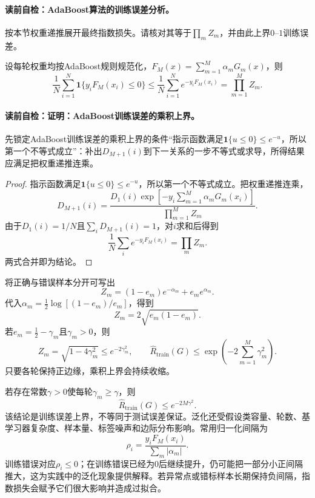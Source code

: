 \paragraph{读前自检：AdaBoost算法的训练误差分析。}按本节权重递推展开最终指数损失。请核对其等于$\prod_m Z_m$，并由此上界$0$--$1$训练误差。\par

\label{struct:V3-C03-CH13}
\begin{theorem}[AdaBoost训练误差的乘积上界]\label{thm:V3-C03-training-bound}
设每轮权重均按AdaBoost规则规范化，$F_M(x)=\sum_{m=1}^{M}\alpha_mG_m(x)$，则
\[
\frac1N\sum_{i=1}^{N}\mathbf{1}\{y_iF_M(x_i)\leq0\}
\leq \frac1N\sum_{i=1}^{N}e^{-y_iF_M(x_i)}
=\prod_{m=1}^{M}Z_m.
\]
\end{theorem}
\paragraph{读前自检：证明：AdaBoost训练误差的乘积上界。}先锁定AdaBoost训练误差的乘积上界的条件“指示函数满足$\mathbf{1}\{u\leq0\}\leq e^{-u}$，所以第一个不等式成立”：补出$D_{M+1}(i)$到下一关系的一步不等式或求导，所得结果应满足把权重递推连乘。\par

\begin{proof}
指示函数满足$\mathbf{1}\{u\leq0\}\leq e^{-u}$，所以第一个不等式成立。把权重递推连乘，
\[
D_{M+1}(i)
=\frac{D_1(i)\exp[-y_i\sum_{m=1}^{M}\alpha_mG_m(x_i)]}
{\prod_{m=1}^{M}Z_m}.
\]
由于$D_1(i)=1/N$且$\sum_iD_{M+1}(i)=1$，对$i$求和后得到
\[
\frac1N\sum_i e^{-y_iF_M(x_i)}=\prod_mZ_m.
\]
两式合并即为结论。
\end{proof}

\label{struct:V3-C03-CH14}
将正确与错误样本分开可写出
\[
Z_m=(1-e_m)e^{-\alpha_m}+e_me^{\alpha_m}.
\]
代入$\alpha_m=\frac12\log[(1-e_m)/e_m]$，得到
\[
Z_m=2\sqrt{e_m(1-e_m)}.
\]
若$e_m=\frac12-\gamma_m$且$\gamma_m>0$，则
\[
Z_m=\sqrt{1-4\gamma_m^2}\leq e^{-2\gamma_m^2},
\qquad
\widehat R_{\mathrm{train}}(G)\leq
\exp\!\left(-2\sum_{m=1}^{M}\gamma_m^2\right).
\]
只要各轮保持正边缘，乘积上界会持续收缩。

\label{struct:V3-C03-CH15}
若存在常数$\gamma>0$使每轮$\gamma_m\geq\gamma$，则
\[
\widehat R_{\mathrm{train}}(G)\leq e^{-2M\gamma^2}.
\]
该结论是训练误差上界，不等同于测试误差保证。泛化还受假设类容量、轮数、基学习器复杂度、样本量、标签噪声和边际分布影响。常用归一化间隔为
\[
\rho_i=\frac{y_iF_M(x_i)}{\sum_m|\alpha_m|}.
\]
训练错误对应$\rho_i\leq0$；在训练错误已经为0后继续提升，仍可能把一部分小正间隔推大，这为实践中的泛化现象提供解释。若异常点或错标样本长期保持负间隔，指数损失会赋予它们很大影响并造成过拟合。

